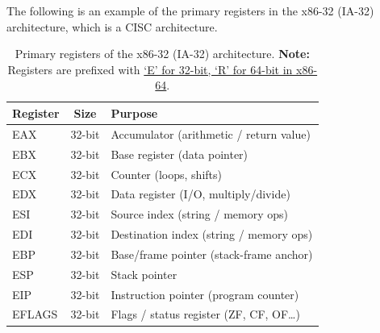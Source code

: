 \newpage

\noindent
The following is an example of the primary registers in the x86-32 (IA-32) architecture, which is a CISC architecture.
\begin{table}[h]
\centering
\begin{tabular}{|l|c|l|}
\hline
\textbf{Register} & \textbf{Size} & \textbf{Purpose} \\
\hline
EAX    & 32-bit & Accumulator (arithmetic / return value) \\
EBX    & 32-bit & Base register (data pointer)            \\
ECX    & 32-bit & Counter (loops, shifts)                 \\
EDX    & 32-bit & Data register (I/O, multiply/divide)    \\
ESI    & 32-bit & Source index (string / memory ops)      \\
EDI    & 32-bit & Destination index (string / memory ops) \\
EBP    & 32-bit & Base/frame pointer (stack-frame anchor) \\
ESP    & 32-bit & Stack pointer                           \\
EIP    & 32-bit & Instruction pointer (program counter)   \\
EFLAGS & 32-bit & Flags / status register (ZF, CF, OF…)   \\
\hline
\end{tabular}
\caption{Primary registers of the x86-32 (IA-32) architecture. \textbf{Note:} Registers are prefixed with \underline{`E' for 32-bit, `R' for 64-bit in x86-64}.}
\end{table}


